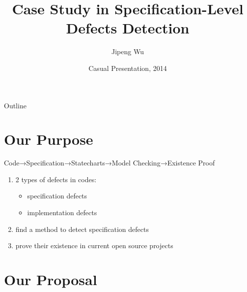 ﻿\documentclass{beamer}
\title[A Brief Introduction to SDDS] {Case Study in Specification-Level Defects Detection}
\subtitle{}
\author[Author]{Jipeng Wu}
\institute[Universities of Somewhere and Elsewhere] {
                                 Software Institute\\
                                 Nanjing University
     }
\date[2014]
{Casual Presentation, 2014}
\begin{document}
\begin{frame}
  \titlepage
\end{frame}

\begin{frame}{Outline}
  \tableofcontents
\end{frame}


\section{Our Purpose}
\begin{frame}{Code→Specification→Statecharts→Model Checking→Existence Proof}
  \begin{enumerate}
  \item 2 types of defects in codes:
    \begin{itemize}
    \item specification defects \pause
    \item implementation defects \pause
    \end{itemize}
  \item find a method to detect specification defects  \pause
  \item prove their existence in current open source projects \pause
  \end{enumerate}
\end{frame}

\section{Our Proposal}
\end{document}
